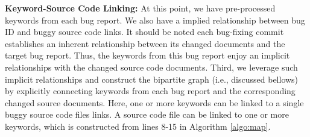 \documentclass[conference]{IEEEtran}
\begin{document}
\textbf{Keyword-Source Code Linking:}
At this point, we have pre-processed keywords from each bug report. We also have a implied relationship between bug ID and buggy source code links.
It should be noted each bug-fixing commit establishes an inherent relationship between its changed documents and the target bug report. 
Thus, the keywords from this bug report enjoy an implicit relationships with the changed source code documents.
Third, we leverage such implicit relationships and construct the bipartite graph (i.e., discussed bellows) by explicitly connecting keywords from each bug report and the corresponding changed source documents.
Here, one or more keywords can be linked to a single buggy source code files links. A source code file can be linked to one or more keywords, which is constructed from lines 8-15 in Algorithm \ref{algo:map}.
\end{document}
